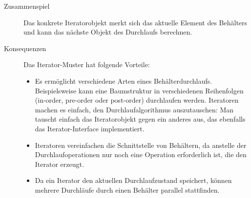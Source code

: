 \begin{description}
	\item[Zusammenspiel] Das konkrete Iteratorobjekt merkt sich das aktuelle Element des Behälters und kann das nächste Objekt des Durchlaufs berechnen.
	\item[Konsequenzen] Das Iterator-Muster hat folgende Vorteile:
	\begin{itemize}
		\item 	Es ermöglicht verschiedene Arten eines Behälterdurchlaufs. Beispiels\-weise kann eine Baumstruktur in verschiedenen Reihenfolgen (\zb in-order, pre-order oder post-order) durchlaufen werden. Iteratoren machen es einfach, den Durchlaufalgorithmus auszutauschen: Man tauscht einfach das Iteratorobjekt gegen ein anderes aus, das ebenfalls das Iterator-Interface implementiert.
		\item 	Iteratoren vereinfachen die Schnittstelle von Behältern, da anstelle der Durchlaufoperationen nur noch eine Operation erforderlich ist, die den Iterator erzeugt.
		\item 	Da ein Iterator den aktuellen Durchlaufzustand speichert, können mehrere Durchläufe durch einen Behälter parallel stattfinden.
	\end{itemize}	
	
\end{description}
	
